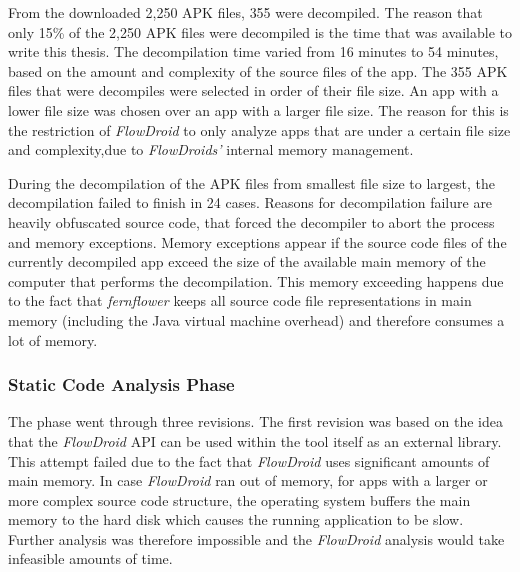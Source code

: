 From the downloaded 2,250 APK files, 355 were decompiled. 
The reason that only 15\% of the 2,250 APK files were decompiled is the time that was available to write this thesis.
The decompilation time varied from 16 minutes to 54 minutes, based on the amount and complexity of the source files of the app.
The 355 APK files that were decompiles were selected in order of their file size.
An app with a lower file size was chosen over an app with a larger file size.
The reason for this is the restriction of \textit{FlowDroid} to only analyze apps that are under a certain file size and complexity,due to \textit{FlowDroids'} internal memory management.

During the decompilation of the APK files from smallest file size to largest, the decompilation failed to finish in 24 cases.
Reasons for decompilation failure are heavily obfuscated source code, that forced the decompiler to abort the process and memory exceptions.
Memory exceptions appear if the source code files of the currently decompiled app exceed the size of the available main memory of the computer that performs the decompilation.
This memory exceeding happens due to the fact that \textit{fernflower} keeps all source code file representations in main memory (including the Java virtual machine overhead) and therefore consumes a lot of memory.

\subsubsection{Static Code Analysis Phase}

The \sca phase went through three revisions. 
The first revision was based on the idea that the \textit{FlowDroid} \acs{API} can be used within the \AIPRAT tool itself as an external library.
This attempt failed due to the fact that \textit{FlowDroid} uses significant amounts of main memory.
In case \textit{FlowDroid} ran out of memory, for apps with a larger or more complex source code structure, the operating system buffers the main memory to the hard disk which causes the running application to be slow.
Further analysis was therefore impossible and the \textit{FlowDroid} analysis would take infeasible amounts of time.

